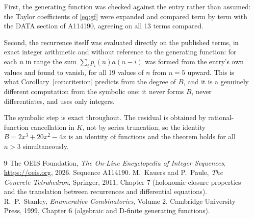 \documentclass[11pt,a4paper]{article}
\theoremstyle{plain}
\theoremstyle{definition}
\begin{document}
First, the generating function was checked against the entry rather than assumed: the
Taylor coefficients of \eqref{eq:gf} were expanded and compared term by term with the DATA
section of A114190, agreeing on all 13 terms compared.

Second, the recurrence itself was evaluated directly on the published terms, in exact
integer arithmetic and without reference to the generating function: for each $n$ in range
the sum $\sum_{i}p_{i}(n)a(n-i)$ was formed from the entry's own values and found to
vanish, for all 19 values of $n$ from $n=5$ upward. This is what
Corollary~\ref{cor:criterion} predicts from the degree of $B$, and it is a genuinely
different computation from the symbolic one: it never forms $B$, never differentiates, and
uses only integers.

The symbolic step is exact throughout. The residual is obtained by rational-function
cancellation in $K$, not by series truncation, so the identity $B=2 x^{3} + 20 x^{2} - 4 x$ is an
identity of functions and the theorem holds for all $n>3$ simultaneously.

\begin{thebibliography}{9}
 The OEIS Foundation, \emph{The On-Line Encyclopedia of Integer Sequences},
\url{https://oeis.org}, 2026. Sequence A114190.
 M.~Kauers and P.~Paule, \emph{The Concrete Tetrahedron}, Springer, 2011,
Chapter 7 (holonomic closure properties and the translation between recurrences and
differential equations).
 R.~P.~Stanley, \emph{Enumerative Combinatorics}, Volume 2, Cambridge
University Press, 1999, Chapter 6 (algebraic and D-finite generating functions).
\end{thebibliography}
\end{document}
